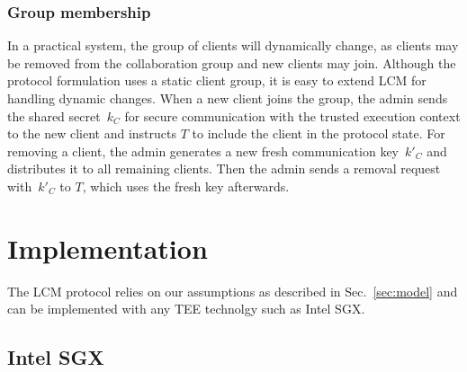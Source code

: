 \documentclass[11pt]{article}
\theoremstyle{plain-boldhead}
\theoremstyle{definition-boldhead}
\newcommand{\pp}{LCM\xspace}
\begin{document}
\subsubsection{Group membership}

In a practical system, the group of clients will dynamically change, as
clients may be removed from the collaboration group and new clients may
join.
% 
Although the protocol formulation uses a static client group, it is easy to
extend \pp for handling dynamic changes.  When a new client joins the
group, the admin sends the shared secret~$k_C$ for secure communication
with the trusted execution context to the new client and instructs $T$ to
include the client in the protocol state.  For removing a client, the admin
generates a new fresh communication key~$k'_C$ and distributes it to all
remaining clients.  Then the admin sends a removal request with~$k'_C$ to
$T$, which uses the fresh key afterwards.


\section{Implementation}\label{sec:impl}


The \pp protocol relies on our assumptions as described in
Sec.~\ref{sec:model} and can be implemented with any TEE technolgy such as Intel SGX.

\subsection{Intel SGX}\label{sec:sgxoverview}
\end{document}
